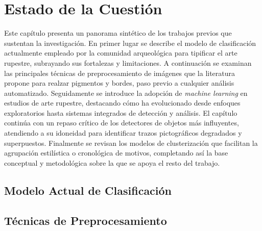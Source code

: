 \section{Estado de la Cuestión}\label{sec:estado_cuestion}

Este capítulo presenta un panorama sintético de los trabajos previos que sustentan la investigación.
En primer lugar se describe el modelo de clasificación actualmente empleado por la comunidad arqueológica para tipificar el arte rupestre, subrayando sus fortalezas y limitaciones.
A continuación se examinan las principales técnicas de preprocesamiento de imágenes que la literatura propone para realzar pigmentos y bordes, paso previo a cualquier análisis automatizado.
Seguidamente se introduce la adopción de \emph{machine learning} en estudios de arte rupestre, destacando cómo ha evolucionado desde enfoques exploratorios hasta sistemas integrados de detección y análisis.
El capítulo continúa con un repaso crítico de los detectores de objetos más influyentes, atendiendo a su idoneidad para identificar trazos pictográficos degradados y superpuestos.
Finalmente se revisan los modelos de clusterización que facilitan la agrupación estilística o cronológica de motivos, completando así la base conceptual y metodológica sobre la que se apoya el resto del trabajo.

\subsection{Modelo Actual de Clasificación}

\begin{center}
\end{center}

\subsection{Técnicas de Preprocesamiento}

